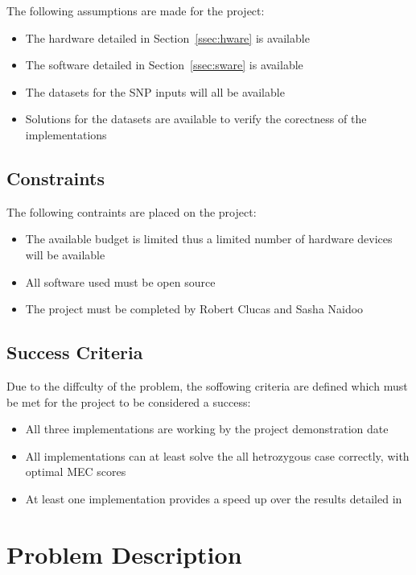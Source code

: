 \documentclass[10pt,twocolumn]{witseiepaper}
\begin{document}
The following assumptions are made for the project:
\begin{itemize}
    \item{The hardware detailed in Section~\ref{ssec:hware} is available}
    \item{The software detailed in Section~\ref{ssec:sware} is available}
    \item{The datasets for the SNP inputs will all be available}
    \item{Solutions for the datasets are available to verify the corectness of the implementations}
\end{itemize}

\subsection{Constraints}

The following contraints are placed on the project:
\begin{itemize}
    \item{The available budget is limited thus a limited number of hardware devices will be available}
    \item{All software used must be open source}
    \item{The project must be completed by Robert Clucas and Sasha Naidoo}
\end{itemize}

\subsection{Success Criteria}

Due to the diffculty of the problem, the soffowing criteria are defined which must be met for the project to
be considered a success:
\begin{itemize}
    \item{All three implementations are working by the project demonstration date}
    \item{All implementations can at least solve the all hetrozygous case correctly, with optimal MEC scores}
    \item{At least one implementation provides a speed up over the results detailed in \cite{chen:2013} }
\end{itemize}


\section{ Problem Description } \label{sec:probdes}
\end{document}

